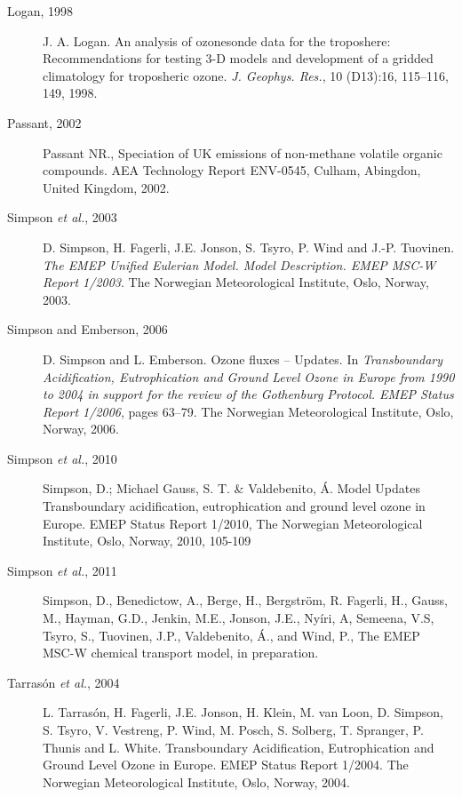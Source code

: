 \begin{description}
\item[Logan, 1998] J. A. Logan. An analysis of ozonesonde data for the
  troposhere: Recommendations for testing 3-D models and development
  of a gridded climatology for troposheric ozone. {\it
    J. Geophys. Res.}, 10 (D13):16, 115--116, 149, 1998.

\item[Passant, 2002] Passant NR., Speciation of UK emissions of non-methane 
volatile organic compounds. AEA Technology Report ENV-0545, Culham, Abingdon,
United Kingdom, 2002.

\item[Simpson {\sl et al.}, 2003] D. Simpson, H. Fagerli, J.E. Jonson, 
                    S. Tsyro, P. Wind and J.-P. Tuovinen.
{\it The EMEP Unified Eulerian Model. Model Description. EMEP MSC-W Report
1/2003}. The Norwegian
Meteorological Institute, Oslo, Norway, 2003.


\item[Simpson and Emberson, 2006] D. Simpson and L. Emberson. Ozone
  fluxes -- Updates.  
 In {\it Transboundary Acidification,
  Eutrophication  and Ground Level Ozone in Europe from 1990 to 2004
  in support for the review of the Gothenburg Protocol. EMEP Status
                   Report 1/2006}, pages 63--79. The Norwegian
Meteorological Institute, Oslo, Norway, 2006. 

\item[Simpson {\sl et al.}, 2010]
Simpson, D.; Michael Gauss, S. T. \& Valdebenito, \'A. Model Updates Transboundary acidification, eutrophication and ground level ozone in Europe. EMEP Status Report 1/2010, The Norwegian Meteorological Institute, Oslo, Norway, 2010, 105-109

\item[Simpson {\sl et al.}, 2011]
Simpson, D., Benedictow, A., Berge, H., Bergstr\"om, R.  Fagerli, H., Gauss, M., Hayman, G.D., Jenkin, M.E., Jonson, J.E., Ny\'iri, A, Semeena, V.S, Tsyro, S., Tuovinen, J.P., Valdebenito, \'A., and Wind, P.,
The EMEP  MSC-W chemical transport model, in preparation.

\item[Tarras\'on {\sl et al.}, 2004] L. Tarras{\'o}n, H. Fagerli, 
              J.E. Jonson, H. Klein, M. van Loon,  
                   D. Simpson, S. Tsyro, V. Vestreng,
                   P. Wind, M. Posch, S. Solberg, T. Spranger,
                   P. Thunis and L. White. Transboundary
                   Acidification, Eutrophication 
                   and Ground Level Ozone in Europe. EMEP Status
                   Report 1/2004. The Norwegian
Meteorological Institute, Oslo, Norway, 2004. 


\end{description}
